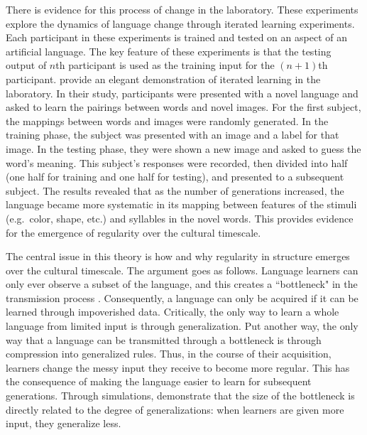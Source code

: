 \documentclass[man, noapacite, 12pt]{apa2}
\begin{document}
There is evidence for this process of change in the laboratory. These experiments explore the dynamics of language change through iterated learning experiments. Each participant in these experiments is trained and tested on an aspect of an artificial language. The key feature of these experiments is that the testing output of $n$th participant is used as the training input for the $(n+1)$th participant.  provide an elegant demonstration of iterated learning in the laboratory. In their study, participants were presented with a novel language and asked to learn the pairings between words and novel images. For the first subject, the mappings between words and images were randomly generated. In the training phase, the subject was presented with an image and a label for that image. In the testing phase, they were shown a new image and asked to guess the word's meaning. This subject's responses were recorded, then divided into half (one half for training and one half for testing), and presented to a subsequent subject. The results revealed that as the number of generations increased, the language became more systematic in its mapping between features of the stimuli (e.g.\ color, shape, etc.) and syllables in the novel words. This provides evidence for the emergence of regularity over the cultural timescale.

The central issue in this theory is how and why regularity in structure emerges over the cultural timescale. The argument goes as follows. Language learners can only ever observe a subset of the language, and this creates a ``bottleneck" in the transmission process \cite{kirby2007evolution}. Consequently, a language can only be acquired if it can be learned through impoverished data. Critically, the only way to learn a whole language from limited input is through generalization. Put another way, the only way that a language can be transmitted through a bottleneck is through compression into generalized rules. Thus, in the course of their acquisition, learners change the messy input they receive to become more  regular. This has the consequence of making the language  easier to learn for subsequent generations. Through simulations,  demonstrate that the size of the bottleneck is directly related to the degree of generalizations: when learners are given more input, they generalize less.
\end{document}
